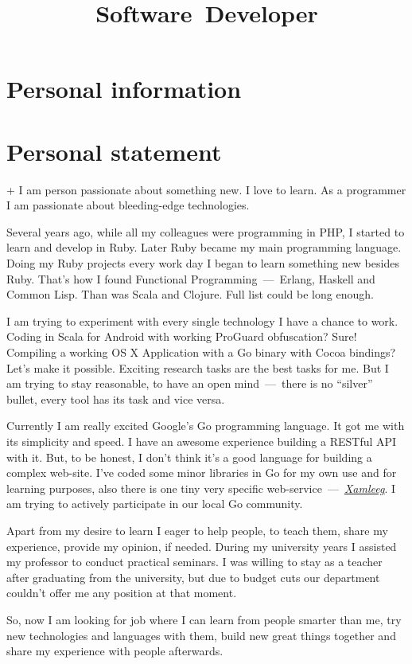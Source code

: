 \documentclass[12pt,a4paper,final]{moderncv}
\title{\mbox{Software Developer}}
\begin{document}
\maketitle
%
\section{Personal information}
%
%
%

\section{Personal statement}
{\parindent=1cm
  \begin{adjustwidth}{\hintscolumnwidth+\separatorcolumnwidth}{}
    \noindent I am person passionate about something new. I love to learn. As a programmer I am passionate about bleeding-edge technologies.

    Several years ago, while all my colleagues were programming in PHP, I started to learn and develop in Ruby. Later Ruby became my main programming language. Doing my Ruby projects every work day I began to learn something new besides Ruby. That's how I found Functional Programming~---~Erlang, Haskell and Common Lisp. Than was Scala and Clojure. Full list could be long enough.

    I am trying to experiment with every single technology I have a chance to work. Coding in Scala for Android with working ProGuard obfuscation? Sure! Compiling a working OS X Application with a Go binary with Cocoa bindings? Let's make it possible. Exciting research tasks are the best tasks for me. But I am trying to stay reasonable, to have an open mind~---~there is no ``silver'' bullet, every tool has its task and vice versa.

    Currently I am really excited Google's Go programming language. It got me with its simplicity and speed. I have an awesome experience building a RESTful API with it. But, to be honest, I don't think it's a good language for building a complex web-site. I've coded some minor libraries in Go for my own use and for learning purposes, also there is one tiny very specific web-service~---~\underline{\href{http://xamleeg.kavu.ru/}{\itshape Xamleeg}}. I am trying to actively participate in our local Go community.

    Apart from my desire to learn I eager to help people, to teach them, share my experience, provide my opinion, if needed. During my university years I assisted my professor to conduct practical seminars. I was willing to stay as a teacher after graduating from the university, but due to budget cuts our department couldn't offer me any position at that moment.

    So, now I am looking for job where I can learn from people smarter than me, try new technologies and languages with them, build new great things together and share my experience with people afterwards.
  \end{adjustwidth}
}
\end{document}
